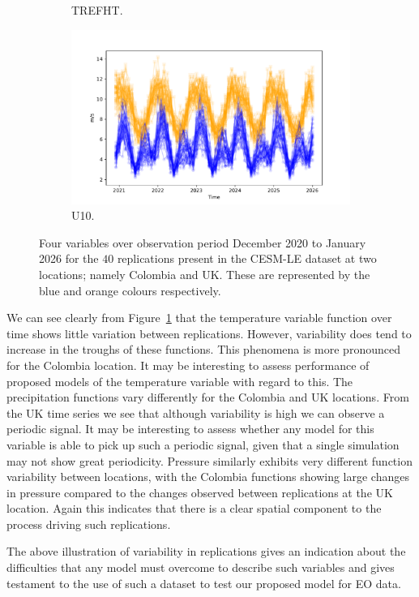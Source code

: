 \begin{figure}[htbp!]
\begin{subfigure}[b]{0.45\textwidth}
		\caption{TREFHT.}
		\label{fig:std_temp_temp}   
	\end{subfigure}             
	\begin{subfigure}[b]{0.45\textwidth}
		\includegraphics[width=\textwidth]{U10_std_temp}
		\caption{U10.}
		\label{fig:std_wind_temp}
	\end{subfigure}             
	\caption[Temporal overview of the variability of Precipitation, Pressure, Temperature, and Wind speed from the CESM-LE dataset.]{ Four variables over observation period December 2020 to January 2026 for the $40$ replications present in the CESM-LE dataset at two locations; namely Colombia and UK. These are represented by the blue and orange colours respectively.}
	\label{fig:std_overview_temp}
\end{figure}

We can see clearly from Figure~\ref{fig:std_temp_temp} that the temperature variable function over time shows little variation between replications. 
However, variability does tend to increase in the troughs of these functions. 
This phenomena is more pronounced for the Colombia location. 
It may be interesting to assess performance of proposed models of the temperature variable with regard to this.
The precipitation functions vary differently for the Colombia and UK locations.
From the UK time series we see that although variability is high we can observe a periodic signal. 
It may be interesting to assess whether any model for this variable is able to pick up such a periodic signal, given that a single simulation may not show great periodicity.
Pressure similarly exhibits very different function variability between locations, with the Colombia functions showing large changes in pressure compared to the changes observed between replications at the UK location. 
Again this indicates that there is a clear spatial component to the process driving such replications. 

The above illustration of variability in replications gives an indication about the difficulties that any model must overcome to describe such variables and gives testament to the use of such a dataset to test our proposed model for EO data.
